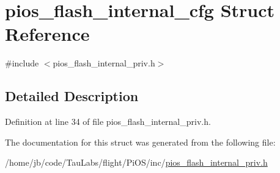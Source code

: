 \hypertarget{structpios__flash__internal__cfg}{\section{pios\-\_\-flash\-\_\-internal\-\_\-cfg \-Struct \-Reference}
\label{structpios__flash__internal__cfg}
}


{\ttfamily \#include $<$pios\-\_\-flash\-\_\-internal\-\_\-priv.\-h$>$}



\subsection{\-Detailed \-Description}


\-Definition at line 34 of file pios\-\_\-flash\-\_\-internal\-\_\-priv.\-h.



\-The documentation for this struct was generated from the following file\-:\begin{DoxyCompactItemize}
\item 
/home/jb/code/\-Tau\-Labs/flight/\-Pi\-O\-S/inc/\hyperlink{pios__flash__internal__priv_8h}{pios\-\_\-flash\-\_\-internal\-\_\-priv.\-h}\end{DoxyCompactItemize}

